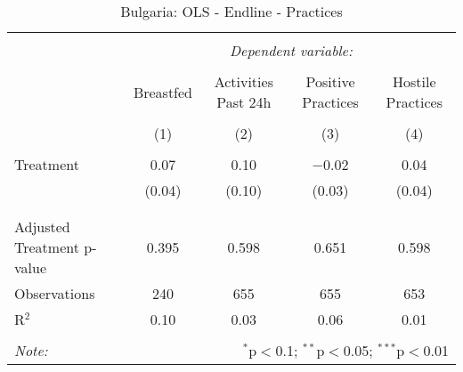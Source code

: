 
\begin{table}[!htbp] \centering 
  \caption{Bulgaria: OLS - Endline - Practices} 
  \label{tbl:Bulgaria: OLS - Endline - Practices} 
\begin{tabular}{@{\extracolsep{5pt}}lcccc} 
\\[-1.8ex]\hline 
\hline \\[-1.8ex] 
 & \multicolumn{4}{c}{\textit{Dependent variable:}} \\ 
\cline{2-5} 
\\[-1.8ex] & Breastfed & Activities Past 24h & Positive Practices & Hostile Practices \\ 
\\[-1.8ex] & (1) & (2) & (3) & (4)\\ 
\hline \\[-1.8ex] 
 Treatment & 0.07 & 0.10 & $-$0.02 & 0.04 \\ 
  & (0.04) & (0.10) & (0.03) & (0.04) \\ 
  & & & & \\ 
\hline \\[-1.8ex] 
Adjusted Treatment p-value & 0.395 & 0.598 & 0.651 & 0.598 \\ 
Observations & 240 & 655 & 655 & 653 \\ 
R$^{2}$ & 0.10 & 0.03 & 0.06 & 0.01 \\ 
\hline 
\hline \\[-1.8ex] 
\textit{Note:}  & \multicolumn{4}{r}{$^{*}$p$<$0.1; $^{**}$p$<$0.05; $^{***}$p$<$0.01} \\ 
\end{tabular} 
\end{table} 
